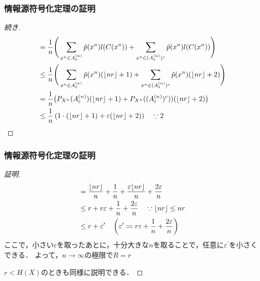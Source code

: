 \documentclass{classes/myslide}
\begin{document}
\begin{frame}\frametitle{情報源符号化定理の証明}
  \begin{proof}[続き]
    \begin{align*}
      &= \frac{1}{n} \Bigg \lparen \sum_{x^n \in A_{\varepsilon}^{(n)}} \tilde{p}(x^n)l(C(x^n)) 
        + \sum_{x^n \in (A_{\varepsilon}^{(n)})^c} \tilde{p}(x^n)l(C(x^n)) \Bigg \rparen \\
      &\leq \frac{1}{n} \Bigg \lparen \sum_{x^n \in A_{\varepsilon}^{(n)}} \tilde{p}(x^n) (\lfloor nr \rfloor + 1) 
          + \sum_{x^n \in (A_{\varepsilon}^{(n)})^c} \tilde{p}(x^n) (\lfloor nr \rfloor + 2) \Bigg \rparen \\
      &= \frac{1}{n} \big \lparen P_{X^n}(A_{\varepsilon}^{(n)})  (\lfloor nr \rfloor + 1) 
        + P_{X^n}((A_{\varepsilon}^{(n)})^c) \rparen (\lfloor nr \rfloor + 2) \big \rparen \\
      &\leq \frac{1}{n} \left \lparen 1 \cdot (\lfloor nr \rfloor + 1)  + \varepsilon (\lfloor nr \rfloor + 2)   \right \rparen \quad \because 2 
    \end{align*}
    \let\qedsymbol\relax
  \end{proof}
\end{frame}

\begin{frame}\frametitle{情報源符号化定理の証明}
  \begin{proof}[証明]
    \begin{align*}
      &= \frac{\lfloor nr \rfloor}{n} + \frac{1}{n} + \frac{\varepsilon \lfloor nr \rfloor}{n} + \frac{2 \varepsilon}{n} \\
      &\leq r + r \varepsilon + \frac{1}{n} + \frac{2\varepsilon}{n} \quad \because \lfloor nr \rfloor \leq nr \\
      &\leq r + \varepsilon^{\prime} \quad \left \lparen \varepsilon^{\prime} \coloneq r \varepsilon + \frac{1}{n} + \frac{2\varepsilon}{n} \right \rparen
    \end{align*}
    ここで，小さい$\varepsilon$を取ったあとに，十分大きな$n$を取ることで，任意に$\varepsilon^{\prime}$を小さくできる．
    よって，$n \to \infty$の極限で$R = r$

    $r < H(X)$のときも同様に説明できる．
  \end{proof}
\end{frame}
\end{document}
